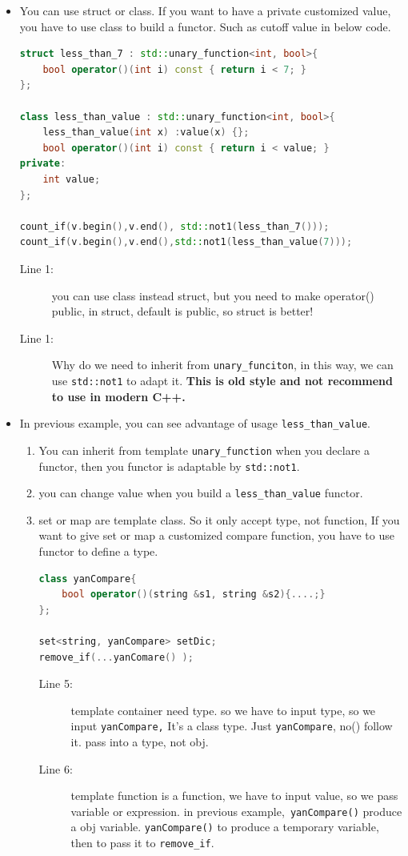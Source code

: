 \documentclass[a4paper,11pt,twoside]{book}
\begin{document}
\begin{itemize}
\item  You can use struct or class. If you want to have a private customized value, you have to use class to build a functor.  Such as cutoff value in below code.
\begin{lstlisting}[frame=single, language=c++]
struct less_than_7 : std::unary_function<int, bool>{
    bool operator()(int i) const { return i < 7; }
};

class less_than_value : std::unary_function<int, bool>{
    less_than_value(int x) :value(x) {};
    bool operator()(int i) const { return i < value; }
private:
    int value;
};

count_if(v.begin(),v.end(), std::not1(less_than_7()));
count_if(v.begin(),v.end(),std::not1(less_than_value(7)));
\end{lstlisting}
\begin{description}
	\item[Line 1:] you can use class instead struct, but you need to make operator() public, in struct, default is public, so struct is better!
	\item[Line 1:] Why do we need to inherit from \texttt{unary\_funciton}, in this way, we can use \texttt{std::not1} to adapt it. \textbf{This is old style and not recommend to use in modern C++.}
\end{description}


   \item In previous example, you can see advantage of usage \texttt{less\_than\_value}.
   \begin{enumerate}
   \item You can inherit from  template \texttt{unary\_function} when you declare a functor, then you functor is adaptable by \texttt{std::not1}.

   \item you can change value when you build a \texttt{less\_than\_value} functor.

   \item set or map are template class. So it only accept type, not function, If you want to give set or map a customized compare function,  you have to use functor to define a type.
\begin{lstlisting}[frame=single, language=c++]
class yanCompare{
    bool operator()(string &s1, string &s2){....;}
};

set<string, yanCompare> setDic;
remove_if(...yanComare() );
\end{lstlisting}
\begin{description}
	\item[Line 5:] template container need type. so we have to input type, so we input \texttt{yanCompare,} It's a class type. Just \texttt{yanCompare}, no() follow it. pass into a type, not obj.
	\item[Line 6:] template function is a function, we have to input value, so we pass variable or expression. in previous example,\texttt{ yanCompare()} produce a obj variable. \texttt{yanCompare()} to produce a temporary variable, then to pass it to \texttt{remove\_if}.
\end{description}
 

\end{enumerate}
\end{itemize}
\end{document}
